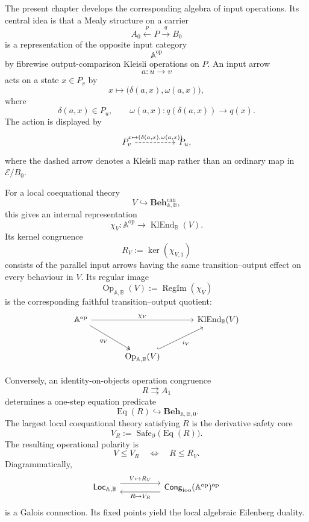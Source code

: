 The present chapter develops the corresponding algebra of input operations.
Its central idea is that a Mealy structure on a carrier
\[
    A_0\xleftarrow{p}P\xrightarrow{q}B_0
\]
is a representation of the opposite input category
\[
    \mathbb A^{\mathrm{op}}
\]
by fibrewise output-comparison Kleisli operations on \(P\). An input arrow
\[
    a:u\to v
\]
acts on a state \(x\in P_v\) by
\[
    x\longmapsto
    \bigl(\delta(a,x),\omega(a,x)\bigr),
\]
where
\[
    \delta(a,x)\in P_u,
    \qquad
    \omega(a,x):
    q(\delta(a,x))\to q(x).
\]
The action is displayed by
\[
\begin{tikzcd}[column sep=huge]
    P_v
        \arrow[r, dashed,
        "{x\mapsto(\delta(a,x),\omega(a,x))}"]
    &
    P_u,
\end{tikzcd}
\]
where the dashed arrow denotes a Kleisli map rather than an ordinary map in
\(\mathcal E/B_0\).

For a local coequational theory
\[
    V\hookrightarrow
    \mathbf{Beh}^{\mathrm{can}}_{\mathbb A,\mathbb B},
\]
this gives an internal representation
\[
    \chi_V:
    \mathbb A^{\mathrm{op}}
    \to
    \operatorname{KlEnd}_{\mathbb B}(V).
\]
Its kernel congruence
\[
    R_V:=\ker(\chi_{V,1})
\]
consists of the parallel input arrows having the same transition--output
effect on every behaviour in \(V\). Its regular image
\[
    \operatorname{Op}_{\mathbb A,\mathbb B}(V)
    :=
    \operatorname{RegIm}(\chi_V)
\]
is the corresponding faithful transition--output quotient:
\[
\begin{tikzcd}[column sep=large, row sep=large]
    \mathbb A^{\mathrm{op}}
        \arrow[rr, "\chi_V"]
        \arrow[dr, two heads, "q_V"']
    &&
    \operatorname{KlEnd}_{\mathbb B}(V)
    \\
    &
    \operatorname{Op}_{\mathbb A,\mathbb B}(V)
        \arrow[ur, hook, "i_V"']
    &
\end{tikzcd}
\]

Conversely, an identity-on-objects operation congruence
\[
    R\rightrightarrows A_1
\]
determines a one-step equation predicate
\[
    \operatorname{Eq}(R)
    \hookrightarrow
    \mathbf{Beh}_{\mathbb A,\mathbb B,0}.
\]
The largest local coequational theory satisfying \(R\) is the derivative
safety core
\[
    V_R
    :=
    \operatorname{Safe}_{\partial}
    \bigl(\operatorname{Eq}(R)\bigr).
\]
The resulting operational polarity is
\[
    V\leq V_R
    \quad\Longleftrightarrow\quad
    R\leq R_V.
\]
Diagrammatically,
\[
\begin{tikzcd}[column sep=huge]
    \mathsf{Loc}_{\mathbb A,\mathbb B}
        \arrow[r, shift left=1.2ex, "{V\mapsto R_V}"]
    &
    \mathsf{Cong}_{\mathrm{ioo}}(\mathbb A^{\mathrm{op}})^{\mathrm{op}}
        \arrow[l, shift left=1.2ex, "{R\mapsto V_R}"]
\end{tikzcd}
\]
is a Galois connection. Its fixed points yield the local algebraic Eilenberg
duality.

